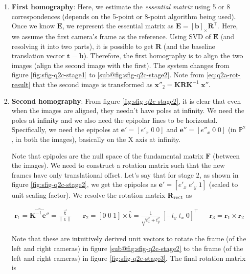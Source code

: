 \begin{enumerate}
    \item \textbf{First homography}: Here, we estimate the \textit{essential matrix} using 5 or 8 correspondences (depends on the 5-point or 8-point algorithm being used). Once we know $\mathbf{E}$, we represent the essential matrix as $\mathbf{E} = [\mathbf{b}]_\times \mathbf{R}^\top$. Here, we assume the first camera's frame as the reference. Using SVD of $\mathbf{E}$ (and resolving it into two parts), it is possible to get $\mathbf{R}$ (and the baseline translation vector $\mathbf{t} = \mathbf{b}$). Therefore, the first homography is to align the two images (align the second image with the first). The system changes from figure \ref{fig:sfig-q2c-stage1} to \ref{sub@fig:sfig-q2c-stage2}. Note from \ref{eq:q2a-rot-result} that the second image is transformed as $\mathbf{x}''_2 = \mathbf{KR} \mathbf{K}^{-1} \; \mathbf{x}''$.
    \item \textbf{Second homography}: From figure \ref{fig:sfig-q2c-stage2}, it is clear that even when the images are aligned, they needn't have poles at infinity. We need the poles at infinity and we also need the epipolar lines to be horizontal. Specifically, we need the epipoles at $\mathbf{e}' = [e'_x \; 0 \; 0]$ and $\mathbf{e}'' = [e''_x \; 0 \; 0]$ (in $\mathbb{P}^2$, in both the images), basically on the X axis at infinity.
    
    Note that epipoles are the null space of the fundamental matrix $\mathbf{F}$ (between the images). We need to construct a rotation matrix such that the new frames have only translational offset. Let's say that for stage 2, as shown in figure \ref{fig:sfig-q2c-stage2}, we get the epipoles as $\mathbf{e}' = [e'_x \; e'_y \; 1]$ (scaled to unit scaling factor). We resolve the rotation matrix $\mathbf{R}_{\textup{rect}}$ as

    \begin{align}
        \mathbf{r}_1 = \widehat{\mathbf{K}^{-1} \mathbf{e}''} = \frac{\overrightarrow{\mathbf{t}}}{\left \| \mathbf{t} \right \|}
        &&
        \mathbf{r}_2 = [0 \; 0 \; 1] \times \widehat{\mathbf{t}} = \frac{1}{\sqrt{t_x^2 + t_y^2}} \, [-t_y \; t_x \; 0]^\top
        &&
        \mathbf{r}_3 = \mathbf{r}_1 \times \mathbf{r}_2
    \end{align}

    Note that these are intuitively derived unit vectors to rotate the frame (of the left and right cameras) in figure \ref{sub@fig:sfig-q2c-stage2} to the frame (of the left and right cameras) in figure \ref{fig:sfig-q2c-stage3}. The final rotation matrix is


\end{enumerate}
